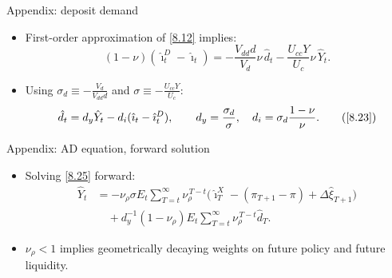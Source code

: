 \documentclass[11pt,aspectratio=169]{beamer}
\begin{document}
\begin{frame}{Appendix: deposit demand}
\begin{itemize}
  \item First-order approximation of \eqref{8.12} implies:
  \[
    (1-\nu)(\hat\imath_t^D-\hat\imath_t)
    =
    -\frac{V_{dd}d}{V_d}\nu\,\hat d_t
    -\frac{U_{cc}Y}{U_c}\nu\,\hat Y_t.
  \]
  \item Using $\sigma_d\equiv -\frac{V_d}{V_{dd}d}$ and $\sigma\equiv -\frac{U_{cc}Y}{U_c}$:
  \[
    \hat d_t
    = d_y\hat Y_t
      - d_i(\hat\imath_t-\hat\imath_t^D),
    \qquad
    d_y=\frac{\sigma_d}{\sigma},\quad
    d_i=\sigma_d\frac{1-\nu}{\nu}. \tag{\ref{8.23}}
  \]
\end{itemize}
\end{frame}

\begin{frame}{Appendix: AD equation, forward solution}
\begin{itemize}
  \item Solving \eqref{8.25} forward:
  \begin{align}
    \hat Y_t
    &=
    -\nu_\rho\sigma
    E_t\sum_{T=t}^{\infty}
    \nu_\rho^{\,T-t}
    \Big(
      \hat\imath_T^X
      -(\pi_{T+1}-\pi)
      +\Delta\hat\xi_{T+1}
    \Big)
    \nonumber\\
    &\quad
    +d_y^{-1}(1-\nu_\rho)
    E_t\sum_{T=t}^{\infty}
    \nu_\rho^{\,T-t}\hat d_T.
    \label{8.26}
  \end{align}
  \item $\nu_\rho<1$ implies geometrically decaying weights on future policy and future liquidity.
\end{itemize}
\vspace{0.1cm}
\begin{center}
\hyperlink{Rate Mapping}{}
\end{center}
\end{frame}
\end{document}
